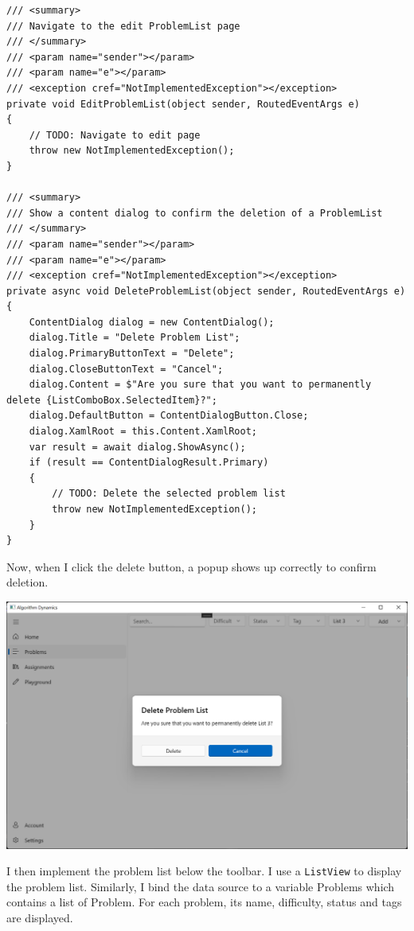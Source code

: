 \documentclass[a4paper]{report}
\begin{document}
\begin{verbatim}
/// <summary>
/// Navigate to the edit ProblemList page
/// </summary>
/// <param name="sender"></param>
/// <param name="e"></param>
/// <exception cref="NotImplementedException"></exception>
private void EditProblemList(object sender, RoutedEventArgs e)
{
    // TODO: Navigate to edit page
    throw new NotImplementedException();
}

/// <summary>
/// Show a content dialog to confirm the deletion of a ProblemList
/// </summary>
/// <param name="sender"></param>
/// <param name="e"></param>
/// <exception cref="NotImplementedException"></exception>
private async void DeleteProblemList(object sender, RoutedEventArgs e)
{
    ContentDialog dialog = new ContentDialog();
    dialog.Title = "Delete Problem List";
    dialog.PrimaryButtonText = "Delete";
    dialog.CloseButtonText = "Cancel";
    dialog.Content = $"Are you sure that you want to permanently delete {ListComboBox.SelectedItem}?";
    dialog.DefaultButton = ContentDialogButton.Close;
    dialog.XamlRoot = this.Content.XamlRoot;
    var result = await dialog.ShowAsync();
    if (result == ContentDialogResult.Primary)
    {
        // TODO: Delete the selected problem list
        throw new NotImplementedException();
    }
}
\end{verbatim}

Now, when I click the delete button, a popup shows up correctly to confirm deletion.

\includegraphics[width=\textwidth, height=\textheight, keepaspectratio]{ProblemsPage-ContentDialog}

I then implement the problem list below the toolbar. I use a \verb|ListView| to display the problem list. Similarly, I bind the data source to a variable Problems which contains a list of Problem. For each problem, its name, difficulty, status and tags are displayed.
\end{document}
